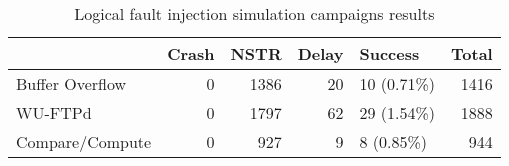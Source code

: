 \begin{table}[H]
\centering
\caption{Logical fault injection simulation campaigns results}
\label{table:end_sim_by_status_hamming_multi_bitflip_reg}
\begin{tabular}{lrrrlr}
\toprule
 & Crash & NSTR & Delay & Success & Total \\
\midrule
Buffer Overflow & 0 & 1386 & 20 & 10 (0.71\%) & 1416 \\
WU-FTPd & 0 & 1797 & 62 & 29 (1.54\%) & 1888 \\
Compare/Compute & 0 & 927 & 9 & 8 (0.85\%) & 944 \\
\bottomrule
\end{tabular}
\end{table}
